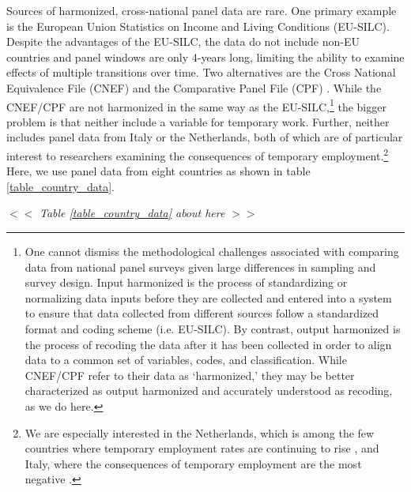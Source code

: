 \documentclass[12pt]{article}
\begin{document}
Sources of harmonized, cross-national panel data are rare.  One primary example is the European Union Statistics on Income and Living Conditions (EU-SILC).  Despite the advantages of the EU-SILC, the data do not include non-EU countries and panel windows are only 4-years long, limiting the ability to examine effects of multiple transitions over time.  Two alternatives are the Cross National Equivalence File (CNEF) \citep{cnef} and the Comparative Panel File (CPF)  \citep{turek_comparative_2021}.  While the CNEF/CPF are not harmonized in the same way as the EU-SILC,\footnote{One cannot dismiss the methodological challenges associated with comparing data from national panel surveys given large differences in sampling and survey design. Input harmonized is the process of standardizing or normalizing data inputs before they are collected and entered into a system to ensure that data collected from different sources follow a standardized format and coding scheme (i.e. EU-SILC).  By contrast, output harmonized is the process of recoding the data after it has been collected in order to align data to a common set of variables, codes, and classification.  While CNEF/CPF refer to their data as `harmonized,' they may be better characterized as output harmonized and accurately understood as recoding, as we do here.} the bigger problem is that neither include a variable for temporary work.  Further, neither includes panel data from Italy or the Netherlands, both of which are of particular interest to researchers examining the consequences of temporary employment.\footnote{We are especially interested in the Netherlands, which is among the few countries where temporary employment rates are continuing to rise \citep{latner2022temporary}, and Italy, where the consequences of temporary employment are the most negative \citep{barbieri_flexible_2009}.}  Here, we use panel data from eight countries as shown in table \ref{table_country_data}.


\begin{center}
$<<$ \emph{Table \ref{table_country_data} about here} $>>$
\end{center}
\end{document}
